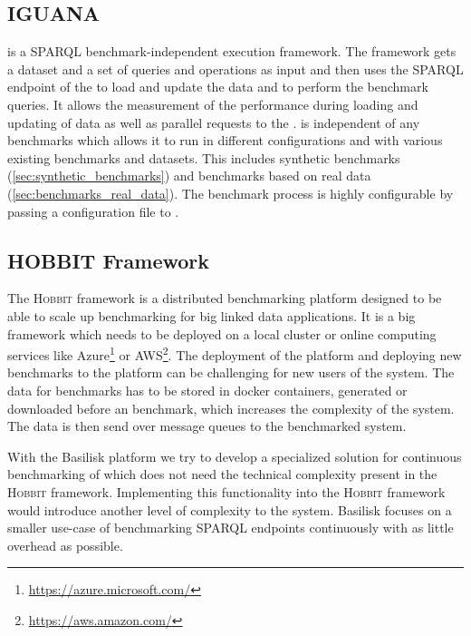 \subsection{IGUANA}
\label{sec:iguana}
\iguana{} is a SPARQL benchmark-independent execution framework\cite{conradsIguanaGenericFramework2017}.
The framework gets a dataset and a set of queries and operations as input and then uses the SPARQL endpoint of the \ts{} to load and update the data and to perform the benchmark queries.
It allows the measurement of the performance during loading and updating of data as well as parallel requests to the \ts{}.
\iguana{} is independent of any benchmarks which allows it to run in different configurations and with various existing benchmarks and datasets.
This includes synthetic benchmarks (\ref{sec:synthetic_benchmarks}) and benchmarks based on real data (\ref{sec:benchmarks_real_data}).
The benchmark process is highly configurable by passing a configuration file to \iguana{}.


\subsection{HOBBIT Framework}
The \textsc{Hobbit} framework is a distributed benchmarking platform designed to be able to scale up benchmarking for big linked data applications\cite{roderHOBBITPlatformBenchmarking}.
It is a big framework which needs to be deployed on a local cluster or online computing services like Azure\footnote{\url{https://azure.microsoft.com/}} or AWS\footnote{\url{https://aws.amazon.com/}}.
The deployment of the platform and deploying new benchmarks to the platform can be challenging for new users of the system\cite{roderHOBBITPlatformBenchmarking}.
The data for benchmarks has to be stored in docker containers, generated or downloaded before an benchmark, which increases the complexity of the system.
The data is then send over message queues to the benchmarked system.

With the Basilisk platform we try to develop a specialized solution for continuous benchmarking of \tsp{} which does not need the technical complexity present in the \textsc{Hobbit} framework.
Implementing this functionality into the \textsc{Hobbit} framework would introduce another level of complexity to the system.
Basilisk focuses on a smaller use-case of benchmarking SPARQL endpoints continuously with as little overhead as possible.


